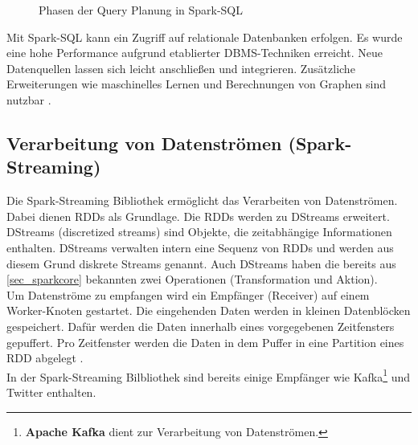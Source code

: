 \begin{figure}[h]
  \centering
  \caption{Phasen der Query Planung in Spark-SQL \cite{AXL+15}}\label{fig:spark_sql}
\end{figure}

\noindent
Mit Spark-SQL kann ein Zugriff auf relationale Datenbanken erfolgen. Es wurde eine hohe Performance aufgrund etablierter DBMS-Techniken erreicht.
Neue Datenquellen lassen sich leicht anschließen und integrieren.
Zusätzliche Erweiterungen wie maschinelles Lernen und Berechnungen von Graphen sind nutzbar \cite{AXL+15}. \\







\newpage
\subsection{Verarbeitung von Datenströmen (Spark-Streaming)}


Die Spark-Streaming Bibliothek ermöglicht das Verarbeiten von Datenströmen. Dabei dienen RDDs als Grundlage. Die RDDs werden zu DStreams erweitert. DStreams (discretized streams) sind Objekte, die zeitabhängige Informationen enthalten. DStreams verwalten intern eine Sequenz von RDDs und werden aus diesem Grund diskrete Streams genannt.
Auch DStreams haben die bereits aus \ref{sec_sparkcore} bekannten zwei Operationen (Transformation und Aktion). \\

\noindent
Um Datenströme zu empfangen wird ein Empfänger (Receiver) auf einem Worker-Knoten gestartet. Die eingehenden Daten werden in kleinen Datenblöcken gespeichert. Dafür werden die Daten innerhalb eines vorgegebenen Zeitfensters gepuffert. Pro Zeitfenster werden die Daten in dem Puffer in eine Partition eines RDD abgelegt \cite[123-130]{BDS16}. \\

\noindent
In der Spark-Streaming Bilbliothek sind bereits einige Empfänger wie Kafka\footnote{\textbf{Apache Kafka} dient zur Verarbeitung von Datenströmen.} und Twitter enthalten. \\

